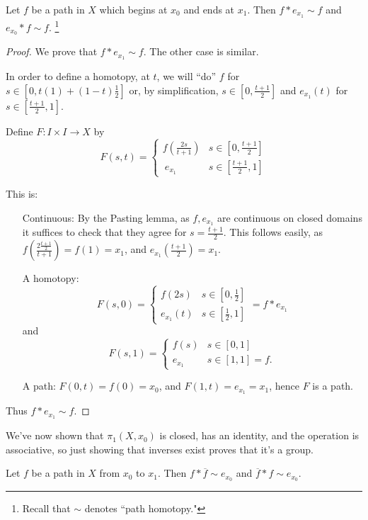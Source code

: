 \begin{lemma}
	[Identity] Let $f$ be a path in $X$ which begins at $x_0$ and ends at $x_1$. Then $f*e_{x_1}\sim f$ and $e_{x_0}* f \sim f$. \footnote{Recall that $\sim$ denotes ``path homotopy."} 
\end{lemma}
\begin{proof}
	We prove that $f* e_{x_1}\sim f$. The other case is similar.
	
	In order to define a homotopy, at $t$, we will ``do'' $f$ for $s\in [0,t(1)+(1-t)\tfrac{1}{2}]$ or, by simplification, $s\in[0,\tfrac{t+1}{2}]$ and $e_{x_1}(t)$ for $s\in [\tfrac{t+1}{2},1]$.
	
	Define $F:I\times I \to X$ by
	\[F(s,t)= 
	\begin{cases}
		f\left(\tfrac{2s}{t+1}\right) & s\in \left[0,\tfrac{t+1}{2}\right] \\\
		e_{x_1} & s\in \left[\frac{t+1}{2},1\right] 
	\end{cases}
	\]
	
	This is: 
	\begin{itemize}
		\item[Continuous:] By the Pasting lemma, as $f, e_{x_1}$ are continuous on closed domains it suffices to check that they agree for $s=\tfrac{t+1}{2}$. This follows easily, as $f\left(\frac{2\tfrac{t+1}{2}}{t+1}\right)=f(1)=x_1$, and $e_{x_1}\left(\tfrac{t+1}{2}\right)=x_1$. 
		\item[A homotopy:]
		\[F(s,0)= 
		\begin{cases}
			f(2s) & s\in\left[0,\tfrac{1}{2}\right]\\
			e_{x_1}(t) & s\in\left[\tfrac{1}{2},1\right] 
		\end{cases}
		= f*e_{x_1}\]
		and
		\[F(s,1)= 
		\begin{cases}
			f(s) & s\in [0,1]\\
			e_{x_1} & s\in [1,1]=f. 
		\end{cases}
		\]
		\item[ A path: ] $F(0,t)=f(0)=x_0$, and $F(1,t)=e_{x_1}=x_1$, hence $F$ is a path. 
	\end{itemize}
	Thus $f*e_{x_1}\sim f$. 
\end{proof}

We've now shown that $\pi_1(X, x_0)$ is closed, has an identity, and the operation is associative, so just showing that inverses exist proves that it's a group. 
\begin{lemma}
	[Inverses] Let $f$ be a path in $X$ from $x_0$ to $x_1$. Then $f*\overline{f}\sim e_{x_0}$ and $\overline{f}*f\sim e_{x_0}$. 
\end{lemma}

